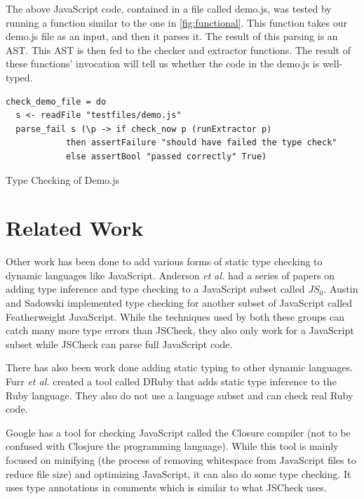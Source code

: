 \documentclass{article}
\begin{document}
The above JavaScript code, contained in a file called demo.js, was tested by running
a function similar to the one in \ref{fig:functional}. This function takes our demo.js 
file as an input, and then it parses it. The result of this parsing is an AST. This AST 
is then fed to the checker and extractor functions. The result of these functions' invocation 
will tell us whether the code in the demo.js is well-typed.


\begin{program}
\begin{verbatim}    
check_demo_file = do
  s <- readFile "testfiles/demo.js"
  parse_fail s (\p -> if check_now p (runExtractor p)
            then assertFailure "should have failed the type check" 
            else assertBool "passed correctly" True)
\end{verbatim}
\caption{Type Checking of Demo.js}
\label{fig:functional}
\end{program}
\pagebreak


\section{Related Work}
\label{sec:related}
Other work has been done to add various forms of static type checking to dynamic
languages like JavaScript. Anderson {\em et al.}
\cite{typeinferenceforjavascriptEcoop, typecheckingforjavascript} had a series of papers
on adding type inference and type checking to a JavaScript subset called $JS_0$. Austin
and Sadowski \cite{fwjsStruct} implemented type checking for another subset of JavaScript called 
Featherweight JavaScript. While the techniques used by both these groups can catch 
many more type errors than JSCheck, 
they also only work for a JavaScript subset while JSCheck can parse full JavaScript code.

There has also been work done adding static typing to other dynamic languages. Furr {\em et al.}
\cite{typecheckingruby} created a tool called DRuby that adds static type inference to
the Ruby language. They also do not use a language subset and can check real Ruby code.

Google has a tool for checking JavaScript called the Closure 
compiler \cite{closureCompiler} (not to be confused with Closjure the programming language).
While this tool is mainly focused on minifying (the process of removing whitespace from
JavaScript files to reduce file size)
and optimizing JavaScript, it can also do some type checking. It uses type
annotations in comments which is similar to what JSCheck uses.
\end{document}
